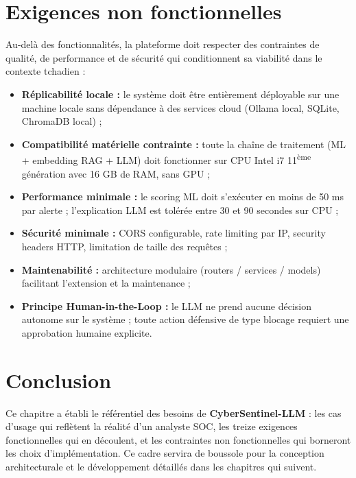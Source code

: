 \documentclass[12pt,a4paper]{report}
\begin{document}
\section{Exigences non fonctionnelles}
\begin{onehalfspace}
Au-delà des fonctionnalités, la plateforme doit respecter des contraintes
de qualité, de performance et de sécurité qui conditionnent sa viabilité
dans le contexte tchadien :

\begin{itemize}
  \item[\ding{43}] \textbf{Réplicabilité locale :} le système doit être
  entièrement déployable sur une machine locale sans dépendance à des
  services cloud (Ollama local, SQLite, ChromaDB local) ;
  \item[\ding{43}] \textbf{Compatibilité matérielle contrainte :} toute la
  chaîne de traitement (ML + embedding RAG + LLM) doit fonctionner sur CPU
  Intel i7 11\textsuperscript{ème} génération avec 16 GB de RAM, sans GPU ;
  \item[\ding{43}] \textbf{Performance minimale :} le scoring ML doit
  s'exécuter en moins de 50 ms par alerte ; l'explication LLM est tolérée
  entre 30 et 90 secondes sur CPU ;
  \item[\ding{43}] \textbf{Sécurité minimale :} CORS configurable,
  rate limiting par IP, security headers HTTP, limitation de taille
  des requêtes ;
  \item[\ding{43}] \textbf{Maintenabilité :} architecture modulaire
  (routers / services / models) facilitant l'extension et la maintenance ;
  \item[\ding{43}] \textbf{Principe Human-in-the-Loop :} le LLM ne prend
  aucune décision autonome sur le système ; toute action défensive de
  type blocage requiert une approbation humaine explicite.
\end{itemize}
\end{onehalfspace}

\section*{Conclusion}
\begin{onehalfspace}
Ce chapitre a établi le référentiel des besoins de \textbf{CyberSentinel-LLM} :
les cas d'usage qui reflètent la réalité d'un analyste SOC, les treize
exigences fonctionnelles qui en découlent, et les contraintes non fonctionnelles
qui borneront les choix d'implémentation. Ce cadre servira de boussole pour
la conception architecturale et le développement détaillés dans les chapitres
qui suivent.
\end{onehalfspace}
\end{document}
